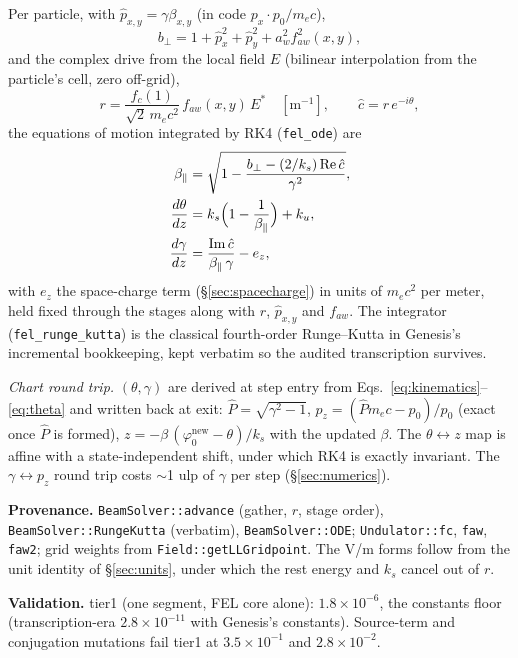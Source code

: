 \documentclass[11pt]{article}
\newcommand{\code}[1]{\texttt{#1}}
\newenvironment{provenance}{\par\small\textbf{Provenance.}}{\par}
\newenvironment{validation}{\par\small\textbf{Validation.}}{\par}
\begin{document}
Per particle, with $\hat p_{x,y} = \gamma\beta_{x,y}$ (in code
$p_{x}\cdot p_0/m_ec$),
\begin{equation}\label{eq:btpar}
  b_\perp = 1 + \hat p_x^2 + \hat p_y^2 + a_w^2 f_{aw}^2(x,y),
\end{equation}
and the complex drive from the local field $E$ (bilinear interpolation from the
particle's cell, zero off-grid),
\begin{equation}\label{eq:rpart}
  r = \frac{f_c(1)}{\sqrt2\, m_e c^2}\, f_{aw}(x,y)\, E^{*} \quad [\mathrm{m}^{-1}],
  \qquad \hat c = r\, e^{-i\theta},
\end{equation}
the equations of motion integrated by RK4 (\code{fel\_ode}) are
\begin{align}
  \beta_\parallel &= \sqrt{1 - \frac{b_\perp - (2/k_s)\,\mathrm{Re}\,\hat c}{\gamma^2}},
  \label{eq:betapar}\\
  \frac{d\theta}{dz} &= k_s\Bigl(1 - \frac{1}{\beta_\parallel}\Bigr) + k_u,
  \label{eq:dtheta}\\
  \frac{d\gamma}{dz} &= \frac{\mathrm{Im}\,\hat c}{\beta_\parallel\,\gamma} - e_z,
  \label{eq:dgamma}
\end{align}
with $e_z$ the space-charge term (\S\ref{sec:spacecharge}) in units of $m_e c^2$ per
meter, held fixed through the stages along with $r$, $\hat p_{x,y}$ and $f_{aw}$. The
integrator (\code{fel\_runge\_kutta}) is the classical fourth-order Runge--Kutta in
Genesis's incremental bookkeeping, kept verbatim so the audited transcription
survives.

\emph{Chart round trip.} $(\theta,\gamma)$ are derived at step entry from
Eqs.~\ref{eq:kinematics}--\ref{eq:theta} and written back at exit:
$\hat P = \sqrt{\gamma^2-1}$, $p_z = (\hat P m_e c - p_0)/p_0$ (exact once $\hat P$ is
formed), $z = -\beta\,(\varphi_0^{\mathrm{new}} - \theta)/k_s$ with the updated
$\beta$. The $\theta \leftrightarrow z$ map is affine with a state-independent shift,
under which RK4 is exactly invariant. The $\gamma \leftrightarrow p_z$ round trip
costs $\sim$1 ulp of $\gamma$ per step (\S\ref{sec:numerics}).

\begin{provenance}
\code{BeamSolver::advance} (gather, $r$, stage order), \code{BeamSolver::RungeKutta}
(verbatim), \code{BeamSolver::ODE}; \code{Undulator::fc}, \code{faw}, \code{faw2};
grid weights from \code{Field::getLLGridpoint}. The V/m forms follow from the unit
identity of \S\ref{sec:units}, under which the rest energy and $k_s$ cancel out of
$r$.
\end{provenance}
\begin{validation}
tier1 (one segment, FEL core alone): $1.8\times10^{-6}$, the constants floor
(transcription-era $2.8\times10^{-11}$ with Genesis's constants). Source-term and
conjugation mutations fail tier1 at $3.5\times10^{-1}$ and $2.8\times10^{-2}$.
\end{validation}
\end{document}
